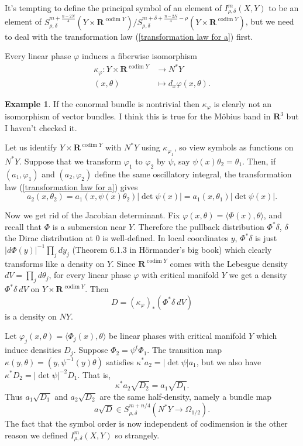 \documentclass[reqno,12pt,letterpaper]{amsart}
\newcommand{\RR}{\mathbf{R}}
\DeclareMathOperator{\codim}{codim}
\theoremstyle{definition}
\newtheorem{example}[theorem]{Example}
\begin{document}
It's tempting to define the principal symbol of an element of $I^m_{\rho, \delta}(X, Y)$ to be an element of $S^{m+\frac{n-2N}{4}}_{\rho,\delta}(Y \times \RR^{\codim Y})/S^{m+\delta+\frac{n-2N}{4}-\rho}_{\rho,\delta}(Y \times \RR^{\codim Y})$,
but we need to deal with the transformation law (\ref{transformation law for a}) first.

Every linear phase $\varphi$ induces a fiberwise isomorphism
\begin{align*}
\kappa_\varphi: Y \times \RR^{\codim Y} &\to N^*Y\\
(x, \theta) &\mapsto d_x\varphi(x, \theta).
\end{align*}

\begin{example}
If the conormal bundle is nontrivial then $\kappa_\varphi$ is clearly not an isomorphism of vector bundles.
I think this is true for the M\"obius band in $\RR^3$ but I haven't checked it.
\end{example}

Let us identify $Y \times \RR^{\codim Y}$ with $N^*Y$ using $\kappa_{\varphi_1}$, so view symbols as functions on $N^*Y$.
Suppose that we transform $\varphi_1$ to $\varphi_2$ by $\psi$, say $\psi(x)\theta_2 = \theta_1$.
Then, if $(a_1, \varphi_1)$ and $(a_2, \varphi_2)$ define the same oscillatory integral, the transformation law (\ref{transformation law for a}) gives
$$a_2(x, \theta_2) = a_1(x, \psi(x)\theta_2)|\det \psi(x)| = a_1(x, \theta_1)|\det \psi(x)|.$$

Now we get rid of the Jacobian determinant.
Fix $\varphi(x, \theta) = \langle \Phi(x), \theta\rangle$, and recall that $\Phi$ is a submersion near $Y$.
Therefore the pullback distribution $\Phi^*\delta$, $\delta$ the Dirac distribution at $0$ is well-defined.
In local coordinates $y$, $\Phi^*\delta$ is just $|d\Phi(y)|^{-1} \prod_j dy_j$ (Theorem 6.1.3 in H\"ormander's big book) which clearly transforms like a density on $Y$.
Since $\RR^{\codim Y}$ comes with the Lebesgue density $dV = \prod_j d\theta_j$, for every linear phase $\varphi$ with critical manifold $Y$ we get a density $\Phi^*\delta ~dV$ on $Y \times \RR^{\codim Y}$.
Then
$$D = (\kappa_{\varphi})_*(\Phi^*\delta ~dV)$$
is a density on $NY$.

Let $\varphi_j(x, \theta) = \langle \Phi_j(x), \theta\rangle$ be linear phases with critical manifold $Y$ which induce densities $D_j$.
Suppose $\Phi_2 = \psi^t \Phi_1$.
The transition map $\kappa(y, \theta) = (y, \psi^{-1}(y)\theta)$ satisfies $\kappa^* a_2 = |\det \psi|a_1$, but we also have $\kappa^*D_2 = |\det \psi|^{-2} D_1$. That is,
$$\kappa^* a_2 \sqrt{D_2} = a_1 \sqrt{D_1}.$$
Thus $a_1 \sqrt{D_1}$ and $a_2 \sqrt{D_2}$ are the same half-density, namely a bundle map
$$a \sqrt D \in S^{m+n/4}_{\rho,\delta}(N^*Y \to \Omega_{1/2}).$$
The fact that the symbol order is now independent of codimension is the other reason we defined $I^m_{\rho,\delta}(X, Y)$ so strangely.
\end{document}
